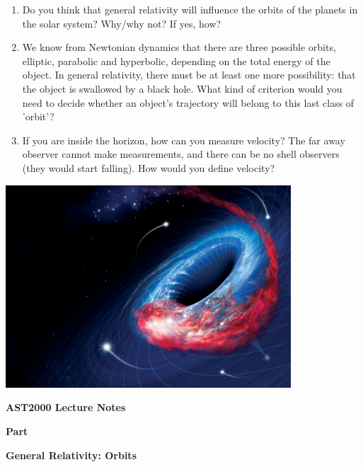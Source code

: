 {\large
\begin{enumerate}
\item Do you think that general relativity will influence the orbits of the planets in the solar system? Why/why not? If yes, how?
\item We know from Newtonian dynamics that there are three possible orbits, elliptic, parabolic and hyperbolic, depending on the total energy of the object. In general relativity, there must be at least one more possibility: that the object is swallowed by a black hole. What kind of criterion would you need to decide whether an object's trajectory will belong to this last class of 'orbit'?
\item If you are inside the horizon, how can you measure velocity? The far away observer cannot make measurements, and there can be no shell observers (they would start falling). How would you define velocity?
\end{enumerate}

\begin{Figure}%
\centering
\includegraphics[width=0.8\textwidth]{bh_orbits.jpg}
\end{Figure}


\clearpage
\vspace*{2cm}

{\centerline{\bf\huge AST2000 Lecture Notes}}

\vspace*{1cm}
{\centerline{\bf\LARGE Part \PartName}}\vspace*{0.25cm}
{\centerline{\bf\LARGE General Relativity: Orbits}}

\vspace*{1cm}

}
